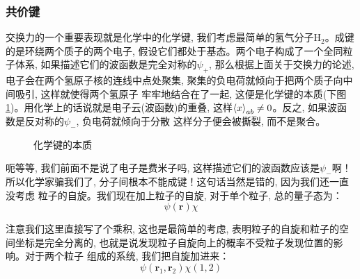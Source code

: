 \subsubsection*{共价键}
交换力的一个重要表现就是化学中的化学键, 我们考虑最简单的氢气分子$\mathrm{H}_2$。成键的是环绕两个质子的两个电子, 假设它们都处于基态。两个电子构成了一个全同粒子体系,
如果描述它们的波函数是完全对称的$\psi_+$, 那么根据上面关于交换力的论述, 电子会在两个氢原子核的连线中点处聚集, 聚集的负电荷就倾向于把两个质子向中间吸引, 这样就使得两个氢原子
牢牢地结合在了一起, 这便是化学键的本质(下图\ref{fig:5.1})。用化学上的话说就是电子云(波函数)的重叠, 这样$\braket{x}_{ab}\neq 0$。反之, 如果波函数是反对称的$\psi_-$, 负电荷就倾向于分散
这样分子便会被撕裂, 而不是聚合。
\begin{figure}[htbp]
    \centering
    \caption{化学键的本质}   %
    \label{fig:5.1}  %
\end{figure}

呃等等, 我们前面不是说了电子是费米子吗, 这样描述它们的波函数应该是$\psi_-$啊！所以化学家骗我们了, 分子间根本不能成键！这句话当然是错的, 因为我们还一直没考虑
粒子的自旋。我们现在加上粒子的自旋, 对于单个粒子, 总的量子态为：
\begin{equation}
    \psi(\mathbf{r})\chi
\end{equation}

注意我们这里直接写了个乘积, 这也是最简单的考虑, 表明粒子的自旋和粒子的空间坐标是完全分离的, 也就是说发现粒子自旋向上的概率不受粒子发现位置的影响。对于两个粒子
组成的系统, 我们把自旋加进来：
\begin{equation}
    \psi(\mathbf{r}_1,\mathbf{r}_2)\chi(1,2)
\end{equation}

